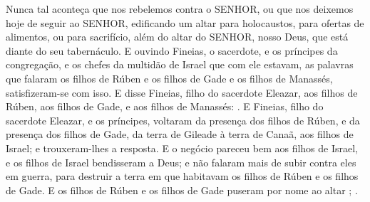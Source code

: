 {{Nunca tal aconteça que nos rebelemos contra o SENHOR, ou que nos deixemos hoje de seguir ao SENHOR, edificando um altar para holocaustos, para ofertas de alimentos, ou para sacrifício, além do altar do SENHOR, nosso Deus, que está diante do seu tabernáculo}.
E ouvindo Fineias, o sacerdote, e os príncipes da congregação, e os chefes da multidão de Israel que com ele estavam, as palavras que falaram os filhos de Rúben e os filhos de Gade e os filhos de Manassés, satisfizeram-se com isso.
E disse Fineias, filho do sacerdote Eleazar, aos filhos de Rúben, aos filhos de Gade, e aos filhos de Manassés: .
E Fineias, filho do sacerdote Eleazar, e os príncipes, voltaram da presença dos filhos de Rúben, e da presença dos filhos de Gade, da terra de Gileade à terra de Canaã, aos filhos de Israel; e trouxeram-lhes a resposta.
E o negócio pareceu bem aos filhos de Israel, e os filhos de Israel bendisseram a Deus; e não falaram mais de subir contra eles em guerra, para destruir a terra em que habitavam os filhos de Rúben e os filhos de Gade.
E os filhos de Rúben e os filhos de Gade puseram por nome ao altar ; .

\par }

